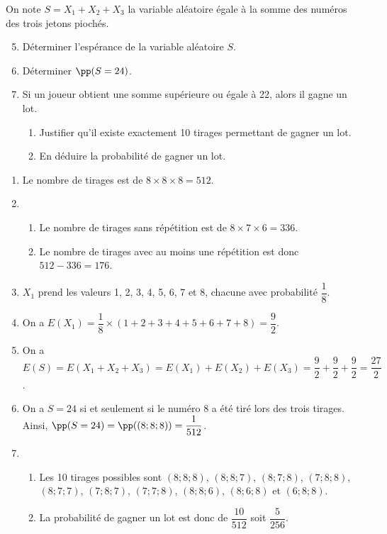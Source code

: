 \documentclass[11pt,fleqn, openany]{book} %
\begin{document}
\begin{exercise}[subtitle={(Centres étrangers 2024)}]
On note $S = X_1 + X_2 + X_3$ la variable aléatoire égale à la somme des numéros des trois jetons piochés.

\begin{enumerate}
\setcounter{enumi}{4}
\item Déterminer l'espérance de la variable aléatoire $S$.
\item Déterminer $\pp(S=24)$.
\item Si un joueur obtient une somme supérieure ou égale à 22, alors il gagne un lot.
\begin{enumerate}
\item Justifier qu'il existe exactement 10 tirages permettant de gagner un lot.
\item En déduire la probabilité de gagner un lot.\end{enumerate}\end{enumerate}

\end{exercise}

\begin{solution}\hspace{0pt}

\begin{enumerate}
\item Le nombre de tirages est de $8 \times 8 \times 8=512$.
\item \begin{enumerate}
\item Le nombre de tirages sans répétition est de $8 \times 7 \times 6=336$.
\item Le nombre de tirages avec au moins une répétition est donc $512-336=176$.
\end{enumerate}
\item $X_1$ prend les valeurs 1, 2, 3, 4, 5, 6, 7 et 8, chacune avec probabilité $\dfrac{1}{8}$.
\item On a $E(X_1)=\dfrac{1}{8} \times (1+2+3+4+5+6+7+8)=\dfrac{9}{2}$.
\item On a $E(S)=E(X_1+X_2+X_3)=E(X_1)+E(X_2)+E(X_3)=\dfrac{9}{2}+\dfrac{9}{2}+\dfrac{9}{2}=\dfrac{27}{2}$.
\item On a $S=24$ si et seulement si le numéro 8 a été tiré lors des trois tirages. Ainsi, $\pp(S=24)=\pp((8;8;8))=\dfrac{1}{512}$.
\item \begin{enumerate}
\item Les 10 tirages possibles sont $(8;8;8)$, $(8;8;7)$, $(8;7;8)$, $(7;8;8)$, $(8;7;7)$, $(7;8;7)$, $(7;7;8)$, $(8;8;6)$, $(8;6;8)$ et $(6;8;8)$.
\item La probabilité de gagner un lot est donc de $\dfrac{10}{512}$ soit $\dfrac{5}{256}$.
\end{enumerate}
\end{enumerate}

\end{solution}
\end{document}
